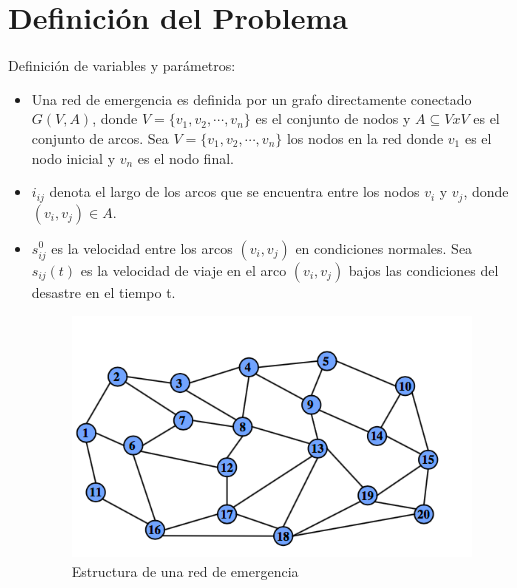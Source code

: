 \documentclass[letter, 10pt]{article}
\begin{document}
\section{Definici\'on del Problema}

Definición de variables y parámetros:
\begin{itemize}
	\item Una red de emergencia es definida por un grafo directamente conectado $G(V,A)$, donde $V=\{v_1,v_2,\cdots, v_n\}$ es el conjunto de nodos y $A\subseteq V x V$ es el conjunto de arcos. Sea $V=\{v_1,v_2,\cdots, v_n\}$ los nodos en la red donde $v_1$ es el nodo inicial y $v_n$ es el nodo final.
	\item $i_{ij}$ denota el largo de los arcos que se encuentra entre los nodos $v_i$ y $v_j$, donde $(v_i,v_j) \in A$.
	\item $s_{ij}^0$ es la velocidad entre los arcos $(v_i,v_j)$ en condiciones normales. Sea $s_{ij}(t)$ es la velocidad de viaje en el arco $(v_i,v_j)$ bajos las condiciones del desastre en el tiempo t.\\

\begin{figure}[h]
\centering
\includegraphics[scale=0.5]{images/routes.png}
\caption{Estructura de una red de emergencia}
\end{figure}
	

\end{itemize}
\end{document}
